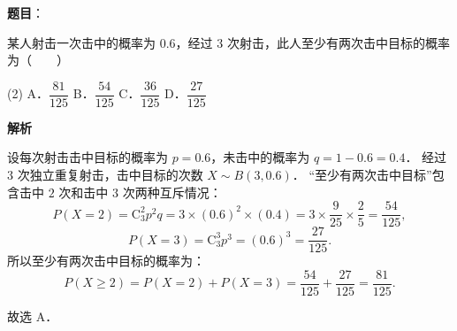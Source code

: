 \begin{answer}

\textbf{题目}：

某人射击一次击中的概率为 $0.6$，经过 $3$ 次射击，此人至少有两次击中目标的概率为\mbox{（　　）}

\begin{gkopts}(2)
\task A．$\dfrac{81}{125}$
\task B．$\dfrac{54}{125}$
\task C．$\dfrac{36}{125}$
\task D．$\dfrac{27}{125}$
\end{gkopts}

\textbf{解析}

设每次射击击中目标的概率为 $p = 0.6$，未击中的概率为 $q = 1 - 0.6 = 0.4$．
经过 $3$ 次独立重复射击，击中目标的次数 $X \sim B(3, 0.6)$．
“至少有两次击中目标”包含击中 $2$ 次和击中 $3$ 次两种互斥情况：
\nopagebreak[4]
\[
P(X = 2) = \mathrm{C}_3^2 p^2 q = 3 \times (0.6)^2 \times (0.4) = 3 \times \dfrac{9}{25} \times \dfrac{2}{5} = \dfrac{54}{125},
\]
\nopagebreak[4]
\[
P(X = 3) = \mathrm{C}_3^3 p^3 = (0.6)^3 = \dfrac{27}{125}.
\]
所以至少有两次击中目标的概率为：
\nopagebreak[4]
\[
P(X \geqslant 2) = P(X = 2) + P(X = 3) = \dfrac{54}{125} + \dfrac{27}{125} = \dfrac{81}{125}.
\]

故选 A．


\end{answer}
